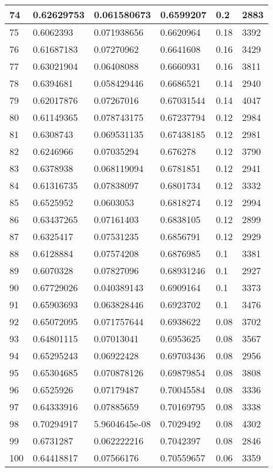 \begin{longtable}{|l|l|l|l|l|l|}
74 & 0.62629753 & 0.061580673 & 0.6599207 & 0.2 & 2883 \\ \hline 
75 & 0.6062393 & 0.071938656 & 0.6620964 & 0.18 & 3392 \\ \hline 
76 & 0.61687183 & 0.07270962 & 0.6641608 & 0.16 & 3429 \\ \hline 
77 & 0.63021904 & 0.06408088 & 0.6660931 & 0.16 & 3811 \\ \hline 
78 & 0.6394681 & 0.058429446 & 0.6686521 & 0.14 & 2940 \\ \hline 
79 & 0.62017876 & 0.07267016 & 0.67031544 & 0.14 & 4047 \\ \hline 
80 & 0.61149365 & 0.078743175 & 0.67237794 & 0.12 & 2984 \\ \hline 
81 & 0.6308743 & 0.069531135 & 0.67438185 & 0.12 & 2981 \\ \hline 
82 & 0.6246966 & 0.07035294 & 0.676278 & 0.12 & 3790 \\ \hline 
83 & 0.6378938 & 0.068119094 & 0.6781851 & 0.12 & 2941 \\ \hline 
84 & 0.61316735 & 0.07838097 & 0.6801734 & 0.12 & 3332 \\ \hline 
85 & 0.6525952 & 0.0603053 & 0.6818274 & 0.12 & 2994 \\ \hline 
86 & 0.63437265 & 0.07161403 & 0.6838105 & 0.12 & 2899 \\ \hline 
87 & 0.6325417 & 0.07531235 & 0.6856791 & 0.12 & 2929 \\ \hline 
88 & 0.6128884 & 0.07574208 & 0.6876985 & 0.1 & 3381 \\ \hline 
89 & 0.6070328 & 0.07827096 & 0.68931246 & 0.1 & 2927 \\ \hline 
90 & 0.67729026 & 0.040389143 & 0.6909164 & 0.1 & 3373 \\ \hline 
91 & 0.65903693 & 0.063828446 & 0.6923702 & 0.1 & 3476 \\ \hline 
92 & 0.65072095 & 0.071757644 & 0.6938622 & 0.08 & 3702 \\ \hline 
93 & 0.64801115 & 0.07013041 & 0.6953625 & 0.08 & 3567 \\ \hline 
94 & 0.65295243 & 0.06922428 & 0.69703436 & 0.08 & 2956 \\ \hline 
95 & 0.65304685 & 0.070878126 & 0.69879854 & 0.08 & 3808 \\ \hline 
96 & 0.6525926 & 0.07179487 & 0.70045584 & 0.08 & 3336 \\ \hline 
97 & 0.64333916 & 0.07885659 & 0.70169795 & 0.08 & 3338 \\ \hline 
98 & 0.70294917 & 5.9604645e-08 & 0.7029492 & 0.08 & 4302 \\ \hline 
99 & 0.6731287 & 0.062222216 & 0.7042397 & 0.08 & 2846 \\ \hline 
100 & 0.64418817 & 0.07566176 & 0.70559657 & 0.06 & 3359 \\ \hline 
\end{longtable}